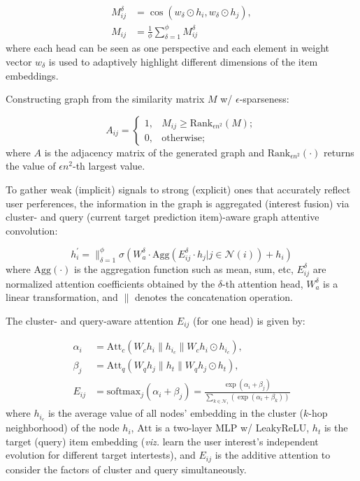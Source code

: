 \begin{align}
	M_{ij}^\delta &= \cos(w_\delta \odot h_i, w_\delta \odot h_j), \\
	M_{ij} &= \frac{1}{\phi} \sum_{\delta = 1}^\phi M_{ij}^\delta
\end{align}
where each head can be seen as one perspective and each element in weight vector $w_\delta$ is used to adaptively highlight different dimensions of the item embeddings.

Constructing graph from the similarity matrix $M$ w/ $\epsilon$-sparseness:

\begin{equation}
	A_{ij} = \begin{cases}
		1, & M_{ij} \ge \text{Rank}_{\epsilon n^2} (M); \\
		0, & \text{otherwise};
	\end{cases}
\end{equation}
where $A$ is the adjacency matrix of the generated graph and $\text{Rank}_{\epsilon n^2}(\cdot)$ returns the value of $\epsilon n^2$-th largest value.

To gather weak (implicit) signals to strong (explicit) ones that accurately reflect user perferences, the information in the graph is aggregated (interest fusion) via cluster- and query (current target prediction item)-aware graph attentive convolution:

\begin{equation}
	h_i^\prime = \parallel_{\delta = 1}^\phi \sigma (W_a^\delta \cdot \text{Agg}(E_{ij}^\delta \cdot h_j | j \in \mathcal{N}(i)) + h_i)
\end{equation}
where $\text{Agg}(\cdot)$ is the aggregation function such as mean, sum, etc, $E_{ij}^\delta$ are normalized attention coefficients obtained by the $\delta$-th attention head, $W_a^\delta$ is a linear transformation, and $\parallel$ denotes the concatenation operation.

The cluster- and query-aware attention $E_{ij}$ (for one head) is given by:

\begin{align}
	\alpha_i &= \text{Att}_c (W_c h_i \parallel h_{i_c} \parallel W_c h_i \odot h_{i_c}), \\
	\beta_j &= \text{Att}_q (W_q h_j \parallel h_t \parallel W_q h_j \odot h_t), \\
	E_{ij} &= \text{softmax}_j (\alpha_i + \beta_j) = \frac{\exp (\alpha_i + \beta_j)}{\sum_{k \in \mathcal{N}_i} (\exp (\alpha_i + \beta_k))}
\end{align}
where $h_{i_c}$ is the average value of all nodes' embedding in the cluster ($k$-hop neighborhood) of the node $h_i$, $\text{Att}$ is a two-layer MLP w/ LeakyReLU, $h_t$ is the target (query) item embedding (\textit{viz.} learn the user interest's independent evolution for different target intertests), and $E_{ij}$ is the additive attention to consider the factors of cluster and query simultaneously.

